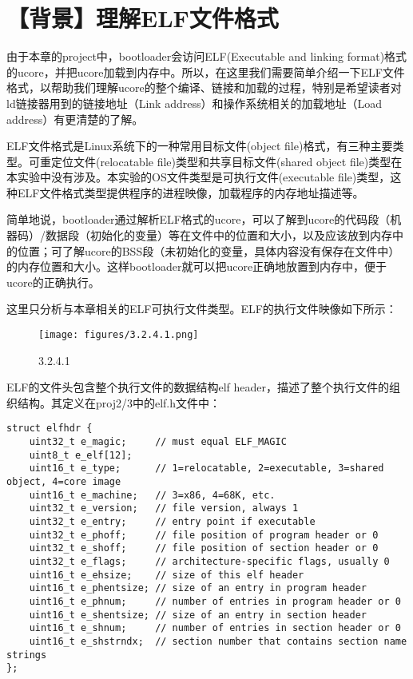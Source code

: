 \section{【背景】理解ELF文件格式}\label{ux80ccux666fux7406ux89e3elfux6587ux4ef6ux683cux5f0f}

由于本章的project中，bootloader会访问ELF(Executable and linking
format)格式的ucore，并把ucore加载到内存中。所以，在这里我们需要简单介绍一下ELF文件格式，以帮助我们理解ucore的整个编译、链接和加载的过程，特别是希望读者对ld链接器用到的链接地址（Link
address）和操作系统相关的加载地址（Load address）有更清楚的了解。

ELF文件格式是Linux系统下的一种常用目标文件(object
file)格式，有三种主要类型。可重定位文件(relocatable
file)类型和共享目标文件(shared object
file)类型在本实验中没有涉及。本实验的OS文件类型是可执行文件(executable
file)类型，这种ELF文件格式类型提供程序的进程映像，加载程序的内存地址描述等。

简单地说，bootloader通过解析ELF格式的ucore，可以了解到ucore的代码段（机器码）/数据段（初始化的变量）等在文件中的位置和大小，以及应该放到内存中的位置；可了解ucore的BSS段（未初始化的变量，具体内容没有保存在文件中）的内存位置和大小。这样bootloader就可以把ucore正确地放置到内存中，便于ucore的正确执行。

这里只分析与本章相关的ELF可执行文件类型。ELF的执行文件映像如下所示：

\begin{figure}[htbp]
\centering
\texttt{[image: figures/3.2.4.1.png]}
\caption{3.2.4.1}
\end{figure}

ELF的文件头包含整个执行文件的数据结构elf
header，描述了整个执行文件的组织结构。其定义在proj2/3中的elf.h文件中：

\begin{lstlisting}
struct elfhdr {
    uint32_t e_magic;     // must equal ELF_MAGIC
    uint8_t e_elf[12];
    uint16_t e_type;      // 1=relocatable, 2=executable, 3=shared object, 4=core image
    uint16_t e_machine;   // 3=x86, 4=68K, etc.
    uint32_t e_version;   // file version, always 1
    uint32_t e_entry;     // entry point if executable
    uint32_t e_phoff;     // file position of program header or 0
    uint32_t e_shoff;     // file position of section header or 0
    uint32_t e_flags;     // architecture-specific flags, usually 0
    uint16_t e_ehsize;    // size of this elf header
    uint16_t e_phentsize; // size of an entry in program header
    uint16_t e_phnum;     // number of entries in program header or 0
    uint16_t e_shentsize; // size of an entry in section header
    uint16_t e_shnum;     // number of entries in section header or 0
    uint16_t e_shstrndx;  // section number that contains section name strings
};
\end{lstlisting}


